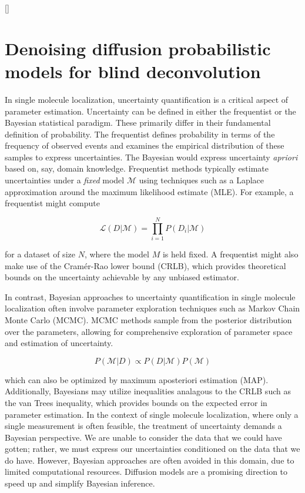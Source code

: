 []

\chapter{Denoising diffusion probabilistic models for blind deconvolution}

In single molecule localization, uncertainty quantification is a critical aspect of parameter estimation. Uncertainty can be defined in either the frequentist or the Bayesian statistical paradigm. These primarily differ in their fundamental definition of probability. The frequentist defines probability in terms of the frequency of observed events and examines the empirical distribution of these samples to express uncertainties. The Bayesian would express uncertainty \emph{apriori} based on, say, domain knowledge. Frequentist methods typically estimate uncertainties under a \emph{fixed} model $\mathcal{M}$ using techniques such as a Laplace approximation around the maximum likelihood estimate (MLE). For example, a frequentist might compute

\begin{equation*}
\mathcal{L}(D\lvert\mathcal{M}) = \prod_{i=1}^{N} P(D_{i}\lvert\mathcal{M})
\end{equation*}

for a dataset of size $N$, where the model $M$ is held fixed. A frequentist might also make use of the Cramér-Rao lower bound (CRLB), which provides theoretical bounds on the uncertainty achievable by any unbiased estimator. 

In contrast, Bayesian approaches to uncertainty quantification in single molecule localization often involve parameter exploration techniques such as Markov Chain Monte Carlo (MCMC). MCMC methods sample from the posterior distribution over the parameters, allowing for comprehensive exploration of parameter space and estimation of uncertainty.

\begin{equation*}
P(\mathcal{M}\lvert D) \propto P(D\lvert\mathcal{M})P(\mathcal{M})
\end{equation*}

which can also be optimized by maximum aposteriori estimation (MAP). Additionally, Bayesians may utilize inequalities analagous to the CRLB such as the van Trees inequality, which provides bounds on the expected error in parameter estimation. In the context of single molecule localization, where only a single measurement is often feasible, the treatment of uncertainty demands a Bayesian perspective. We are unable to consider the data that we could have gotten; rather, we must express our uncertainties conditioned on the data that we do have. However, Bayesian approaches are often avoided in this domain, due to limited computational resources. Diffusion models are a promising direction to speed up and simplify Bayesian inference. 